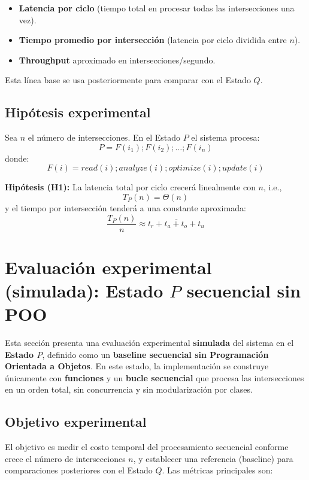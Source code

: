 \documentclass[12pt]{article}
\begin{document}
\begin{itemize}
\item \textbf{Latencia por ciclo} (tiempo total en procesar todas las intersecciones una vez).
\item \textbf{Tiempo promedio por intersección} (latencia por ciclo dividida entre \(n\)).
\item \textbf{Throughput} aproximado en intersecciones/segundo.
\end{itemize}

Esta línea base se usa posteriormente para comparar con el Estado \(Q\).

\subsection{Hipótesis experimental}

Sea \(n\) el número de intersecciones. En el Estado \(P\) el sistema procesa:
\[
P = F(i_1); F(i_2); \dots ; F(i_n)
\]
donde:
\[
F(i)= read(i); analyze(i); optimize(i); update(i)
\]

\textbf{Hipótesis (H1):} La latencia total por ciclo crecerá linealmente con \(n\), i.e.,
\[
T_P(n) = \Theta(n)
\]
y el tiempo por intersección tenderá a una constante aproximada:
\[
\frac{T_P(n)}{n} \approx \overline{t_r+t_a+t_o+t_u}
\]

\section{Evaluación experimental (simulada): Estado \(P\) secuencial sin POO}

Esta sección presenta una evaluación experimental \textbf{simulada} del sistema en el \textbf{Estado \(P\)},
definido como un \textbf{baseline secuencial sin Programación Orientada a Objetos}. En este estado,
la implementación se construye únicamente con \textbf{funciones} y un \textbf{bucle secuencial} que procesa
las intersecciones en un orden total, sin concurrencia y sin modularización por clases.

\subsection{Objetivo experimental}

El objetivo es medir el costo temporal del procesamiento secuencial conforme crece el número de intersecciones \(n\),
y establecer una referencia (baseline) para comparaciones posteriores con el Estado \(Q\).
Las métricas principales son:
\end{document}
